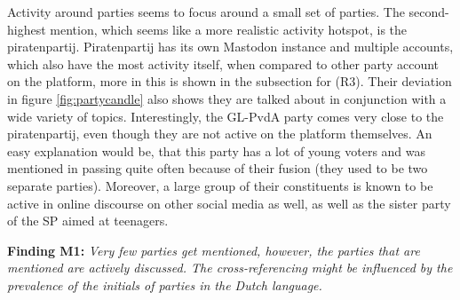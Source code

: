Activity around parties seems to focus around a small set of parties.
The second-highest mention, which seems like a more realistic activity hotspot, is the piratenpartij.
Piratenpartij has its own Mastodon instance and multiple accounts, which also have the most activity itself, when compared to other party account on the platform, more in this is shown in the subsection for (R3).
Their deviation in figure \ref{fig:partycandle} also shows they are talked about in conjunction with a wide variety of topics.
Interestingly, the GL-PvdA party comes very close to the piratenpartij, even though they are not active on the platform themselves.
An easy explanation would be, that this party has a lot of young voters and was mentioned in passing quite often because of their fusion (they used to be two separate parties).
Moreover, a large group of their constituents is known to be active in online discourse on other social media as well, as well as the sister party of the SP aimed at teenagers. 

\textbf{Finding M1:} \textit{Very few parties get mentioned, however, the parties that are mentioned are actively discussed. The cross-referencing might be influenced by the prevalence of the initials of parties in the Dutch language.}


